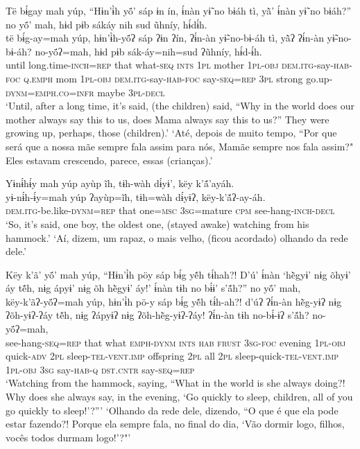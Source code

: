 \documentclass[output=paper,
modfonts,nonflat
]{langsci/langscibook}
\begin{document}
\ea  Të bɨ́gay mah yúp, “Hɨn’ɨ̀h yö́’ sáp ɨn ín, ɨ́nàn yɨ̃ no bɨáh tì, yã̀’ ɨ́nàn yɨ̃ no bɨáh?” no yö́’ mah, hɨd pɨb sákáy nih sud ũhníy, hɨ́dɨ́h.\\ 
\gll të bɨ́g-ay=mah yúp, hɨn’ɨ̀h-yö́ʔ sáp ʔɨn ʔín, ʔɨ́n-àn yɨ̃-no-bɨ-áh tì, yã̀ʔ ʔɨ́n-àn yɨ̃-no-bɨ-áh? no-yö́ʔ=mah, hɨd pɨb sák-áy=nih=sud ʔũhníy, hɨ́d-ɨ́h.\\
     until long.time\textsc{-inch=rep} that what\textsc{-seq} \textsc{ints} \textsc{1pl} mother \textsc{1pl-obj} \textsc{dem.itg-}say\textsc{-hab-foc} \textsc{q.emph} mom \textsc{1pl-obj} \textsc{dem.itg}-say-\textsc{hab-foc} say\textsc{-seq=rep} \textsc{3pl} strong go.up\textsc{-dynm=emph.co=infr} maybe \textsc{3pl-decl}\\
\glt ‘Until, after a long time, it’s said, (the children) said, “Why in the world does our mother always say this to us, does Mama always say this to us?” They were growing up, perhaps, those (children).'
\glt ‘Até, depois de muito tempo, “Por que será que a nossa mãe sempre fala assim para nós, Mamãe sempre nos fala assim?" Eles estavam crescendo, parece, essas (crianças).'
\z 

\ea  Yɨnɨ́hɨ́y mah yúp ayùp ĩh, tɨh-wàh dɨ́yɨ’, këy k’ã́’ayáh.\\ 
\gll yɨ-nɨ́h-ɨ́y=mah yúp ʔayùp=ĩh, tɨh=wàh dɨ́yɨʔ, këy-k’ã́ʔ-ay-áh.\\
     \textsc{dem.itg-}be.like\textsc{-dynm=rep} that one\textsc{=msc} \textsc{3sg=}mature \textsc{cpm} see-hang\textsc{-inch-decl}\\
\glt ‘So, it's said, one boy, the oldest one, (stayed awake) watching from his hammock.'
\glt ‘Aí, dizem, um rapaz, o mais velho, (ficou acordado) olhando da rede dele.'
\z 

\ea  Këy k’ã’ yö́’ mah yúp, “Hɨn’ɨ̀h pöy sáp bɨ́g yẽ́h tɨ́hah?!  D’ú’ ɨ́nàn ‘hẽ̀gyɨ’ nɨg õhyɨ’ áy tẽ́h, nɨg ápyɨ’ nɨg õh hẽ̀gyɨ’ áy!' ɨ́nàn tɨh no bɨ́ɨ’ s’ã́h?” no yö́’ mah,\\ 
\gll këy-k’ãʔ-yö́ʔ=mah yúp, hɨn’ɨ̀h pö-y sáp bɨ́g yẽ́h tɨ́h-ah?!  d’úʔ ʔɨ́n-àn hẽ̀g-yɨʔ nɨg ʔõh-yɨʔ-ʔáy tẽ́h, nɨg ʔápyɨʔ nɨg ʔõh-hẽ̀g-yɨʔ-ʔáy! ʔɨ́n-àn tɨh no-bɨ́-ɨʔ s’ã́h? no-yö́ʔ=mah,\\
     see-hang\textsc{-seq=rep} that what \textsc{emph-dynm} \textsc{ints} \textsc{hab} \textsc{frust} \textsc{3sg-foc} evening \textsc{1pl-obj} quick\textsc{-adv} \textsc{2pl} sleep\textsc{-tel-vent.imp} offspring \textsc{2pl} all \textsc{2pl} sleep-quick\textsc{-tel-vent.imp} \textsc{1pl-obj} \textsc{3sg} say\textsc{-hab-q} \textsc{dst.cntr}{\footnotemark} say\textsc{-seq=rep}\\
\glt ‘Watching from the hammock, saying, “What in the world is she always doing?! Why does she always say, in the evening, ‘Go quickly to sleep, children, all of you go quickly to sleep!'?”'
\glt ‘Olhando da rede dele, dizendo, “O que é que ela pode estar fazendo?! Porque ela sempre fala, no final do dia, ‘Vão dormir logo, filhos, vocês todos durmam logo!'?"'
\z 
{}
\end{document}
